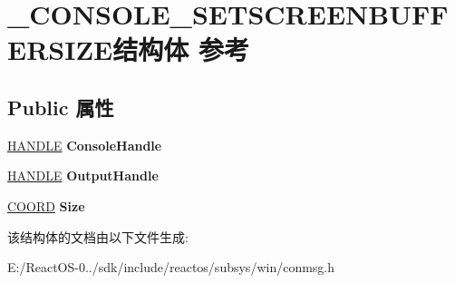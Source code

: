 \hypertarget{struct___c_o_n_s_o_l_e___s_e_t_s_c_r_e_e_n_b_u_f_f_e_r_s_i_z_e}{}\section{\+\_\+\+C\+O\+N\+S\+O\+L\+E\+\_\+\+S\+E\+T\+S\+C\+R\+E\+E\+N\+B\+U\+F\+F\+E\+R\+S\+I\+Z\+E结构体 参考}
\label{struct___c_o_n_s_o_l_e___s_e_t_s_c_r_e_e_n_b_u_f_f_e_r_s_i_z_e}
\subsection*{Public 属性}
\begin{DoxyCompactItemize}
\item 
\mbox{\label{struct___c_o_n_s_o_l_e___s_e_t_s_c_r_e_e_n_b_u_f_f_e_r_s_i_z_e_ab8faa5c7334f7a5b2738cec01ee85bef}} 
\hyperlink{interfacevoid}{H\+A\+N\+D\+LE} {\bfseries Console\+Handle}
\item 
\mbox{\label{struct___c_o_n_s_o_l_e___s_e_t_s_c_r_e_e_n_b_u_f_f_e_r_s_i_z_e_af9e1aea7ba570fe4d6b6414c31ecbf74}} 
\hyperlink{interfacevoid}{H\+A\+N\+D\+LE} {\bfseries Output\+Handle}
\item 
\mbox{\label{struct___c_o_n_s_o_l_e___s_e_t_s_c_r_e_e_n_b_u_f_f_e_r_s_i_z_e_a9401926d81f81dfe488785f4545b6a2b}} 
\hyperlink{struct___c_o_o_r_d}{C\+O\+O\+RD} {\bfseries Size}
\end{DoxyCompactItemize}


该结构体的文档由以下文件生成\+:\begin{DoxyCompactItemize}
\item 
E\+:/\+React\+O\+S-\/0../sdk/include/reactos/subsys/win/conmsg.\+h\end{DoxyCompactItemize}
